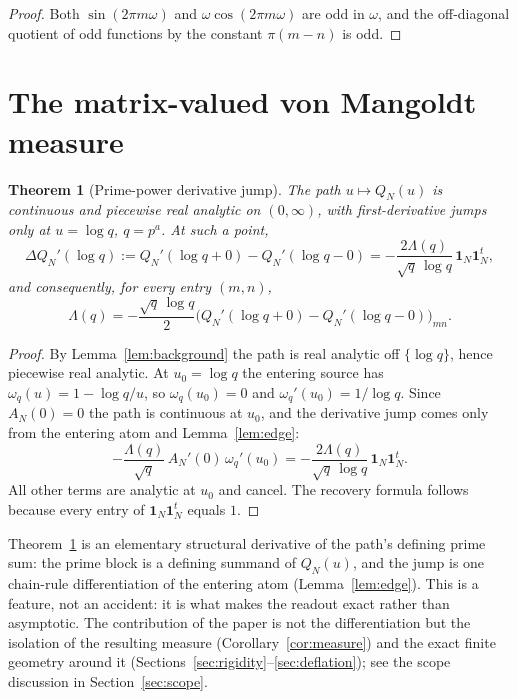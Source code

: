\documentclass[11pt]{article}
\theoremstyle{plain}
\newtheorem{theorem}{Theorem}[section]
\theoremstyle{definition}
\theoremstyle{remark}
\newcommand{\one}{\mathbf 1}
\newcommand{\Lam}{\Lambda}
\begin{document}
\begin{proof}
Both $\sin(2\pi m\omega)$ and $\omega\cos(2\pi m\omega)$ are odd in $\omega$, and
the off-diagonal quotient of odd functions by the constant $\pi(m-n)$ is odd.
\end{proof}

\section{The matrix-valued von Mangoldt measure}\label{sec:measure}

\begin{theorem}[Prime-power derivative jump]\label{thm:jump}
The path $u\mapsto Q_N(u)$ is continuous and piecewise real analytic on
$(0,\infty)$, with first-derivative jumps only at $u=\log q$, $q=p^a$. At such a
point,
\[
        \Delta Q_N'(\log q):=Q_N'(\log q+0)-Q_N'(\log q-0)
        =-\frac{2\Lam(q)}{\sqrt q\,\log q}\,\one_N\one_N^t,
\]
and consequently, for every entry $(m,n)$,
\[
        \Lam(q)=-\frac{\sqrt q\,\log q}{2}
        \bigl(Q_N'(\log q+0)-Q_N'(\log q-0)\bigr)_{mn}.
\]
\end{theorem}

\begin{proof}
By Lemma~\ref{lem:background} the path is real analytic off $\{\log q\}$, hence
piecewise real analytic. At $u_0=\log q$ the entering source has
$\omega_q(u)=1-\log q/u$, so $\omega_q(u_0)=0$ and $\omega_q'(u_0)=1/\log q$.
Since $A_N(0)=0$ the path is continuous at $u_0$, and the derivative jump comes
only from the entering atom and Lemma~\ref{lem:edge}:
\[
 -\frac{\Lam(q)}{\sqrt q}\,A_N'(0)\,\omega_q'(u_0)
 =-\frac{2\Lam(q)}{\sqrt q\,\log q}\,\one_N\one_N^t .
\]
All other terms are analytic at $u_0$ and cancel. The recovery formula follows
because every entry of $\one_N\one_N^t$ equals $1$.
\end{proof}

\noindent Theorem~\ref{thm:jump} is an elementary structural derivative of the
path's defining prime sum: the prime block is a defining summand of $Q_N(u)$,
and the jump is one chain-rule differentiation of the entering atom
(Lemma~\ref{lem:edge}). This is a feature, not an accident: it is what makes
the readout exact rather than asymptotic. The contribution of the paper is not
the differentiation but the isolation of the resulting measure
(Corollary~\ref{cor:measure}) and the exact finite geometry around it
(Sections~\ref{sec:rigidity}--\ref{sec:deflation}); see the scope discussion in
Section~\ref{sec:scope}.
\end{document}

